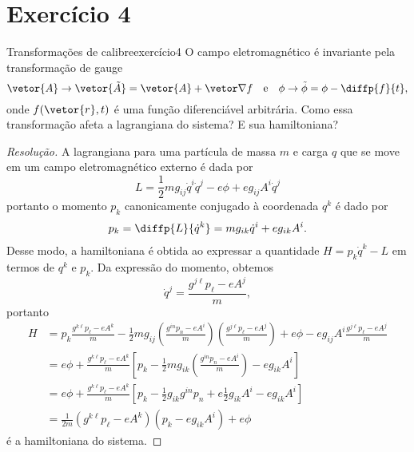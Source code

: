 \section*{Exercício 4}
\begin{exercício}{Transformações de calibre}{exercício4}
    O campo eletromagnético é invariante pela transformação de gauge
    \begin{equation*}
        \vetor{A} \to \vetor{\tilde{A}} = \vetor{A} + \vetor\nabla f\quad\text{e}\quad\phi \to \tilde\phi = \phi - \diffp{f}{t},
    \end{equation*}
    onde \(f(\vetor{r}, t)\) é uma função diferenciável arbitrária. Como essa transformação afeta a lagrangiana do sistema? E sua hamiltoniana?
\end{exercício}
\begin{proof}[Resolução]
    A lagrangiana para uma partícula de massa \(m\) e carga \(q\) que se move em um campo eletromagnético externo é dada por
    \begin{equation*}
        L = \frac12 mg_{ij}\dot{q}^i\dot{q}^j - e\phi + eg_{ij}A^i\dot{q}^j
    \end{equation*}
    portanto o momento \(p_k\) canonicamente  conjugado à coordenada \(q^k\) é dado por
    \begin{align*}
        p_k = \diffp{L}{\dot{q}^k} = m g_{ik} \dot{q}^i + e g_{ik}A^i.
    \end{align*}
    Desse modo, a hamiltoniana é obtida ao expressar a quantidade \(H = p_k \dot{q}^k - L\) em termos de \(q^k\) e \(p_k\). Da expressão do momento, obtemos
    \begin{equation*}
        \dot{q}^j = \frac{g^{j\ell}p_\ell - e A^j}{m},
    \end{equation*}
    portanto
    \begin{align*}
        H &= p_k \frac{g^{k\ell}p_\ell - e A^k}{m} - \frac12 m g_{ij} \left(\frac{g^{in}p_n- e A^i}{m}\right)\left(\frac{g^{j\ell}p_\ell - e A^j}{m}\right) + e\phi - e g_{ij} A^i \frac{g^{j\ell}p_\ell - e A^j}{m}\\
          &= e\phi + \frac{g^{k\ell}p_\ell - e A^k}{m}\left[p_k - \frac12 m g_{ik}\left(\frac{g^{in}p_n- e A^i}{m}\right) - e g_{ik}A^i\right]\\
          &= e\phi + \frac{g^{k\ell}p_\ell - e A^k}{m}\left[p_k - \frac12 g_{ik}g^{in}p_n + e \frac12g_{ik}A^i - e g_{ik}A^i\right]\\
          &= \frac1{2m} \left(g^{k\ell}p_\ell - eA^k\right)\left(p_k - e g_{ik}A^i\right) + e\phi%
    \end{align*}
    é a hamiltoniana do sistema.


\end{proof}
